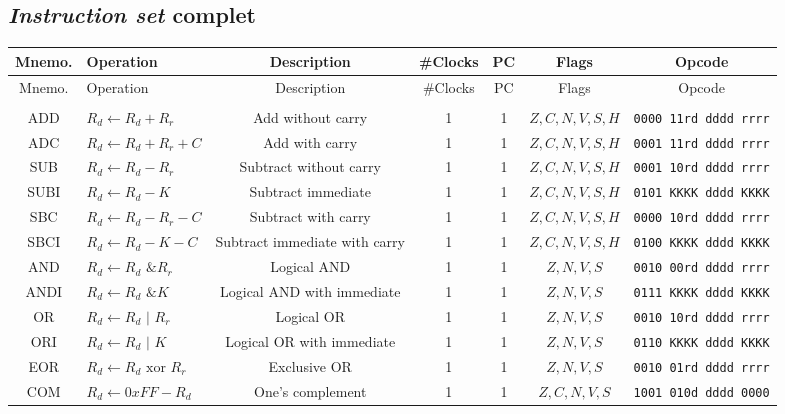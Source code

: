 \documentclass[11pt]{article}
\begin{document}
\subsection{\emph{Instruction set} complet}
\tiny
\noindent\begin{center}
    \begin{longtable}{|c|m{12em}|c|c|c|c|c|}
\hline
Mnemo. & Operation & Description & \#Clocks & PC & Flags & Opcode\\
\hline\hline
\endhead

\hline\hline
Mnemo. & Operation & Description & \#Clocks & PC & Flags & Opcode\\
\hline
\endfoot

\multicolumn{7}{|c|}{Arithmetic} \\\hline
ADD & $R_d \leftarrow R_d + R_r$ & Add without carry & 1 & 1 & $Z, C, N, V, S, H$ & \texttt{0000 11rd dddd rrrr}\\
ADC & $R_d \leftarrow R_d + R_r + C$ & Add with carry & 1 & 1 & $Z, C, N, V, S, H$ & \texttt{0001 11rd dddd rrrr}\\
SUB & $R_d \leftarrow R_d - R_r$ & Subtract without carry & 1 & 1 & $Z, C, N, V, S, H$ & \texttt{0001 10rd dddd rrrr}\\
SUBI & $R_d \leftarrow R_d - K$ & Subtract immediate & 1 & 1 & $Z, C, N, V, S, H$ & \texttt{0101 KKKK dddd KKKK}\\
SBC & $R_d \leftarrow R_d - R_r - C$ & Subtract with carry & 1 & 1 & $Z, C, N, V, S, H$ & \texttt{0000 10rd dddd rrrr}\\
SBCI & $R_d \leftarrow R_d - K - C$ & Subtract immediate with carry & 1 & 1 & $Z, C, N, V, S, H$ & \texttt{0100 KKKK dddd KKKK}\\
AND & $R_d \leftarrow R_d \text{ \& } R_r$ & Logical AND & 1 & 1 & $Z, N, V, S$ & \texttt{0010 00rd dddd rrrr}\\
ANDI & $R_d \leftarrow R_d \text{ \& } K$ & Logical AND with immediate & 1 & 1 & $Z, N, V, S$ & \texttt{0111 KKKK dddd KKKK}\\
OR & $R_d \leftarrow R_d \text{ | } R_r$ & Logical OR & 1 & 1 & $Z, N, V, S$ & \texttt{0010 10rd dddd rrrr}\\
ORI & $R_d \leftarrow R_d \text{ | } K$ & Logical OR with immediate & 1 & 1 & $Z, N, V, S$ & \texttt{0110 KKKK dddd KKKK}\\
EOR & $R_d \leftarrow R_d \text{ xor } R_r$ & Exclusive OR & 1 & 1 & $Z, N, V, S$ & \texttt{0010 01rd dddd rrrr}\\
COM & $R_d \leftarrow 0xFF - R_d$ & One's complement & 1 & 1 & $Z, C, N, V, S$ & \texttt{1001 010d dddd 0000}\\

\end{longtable}
\end{center}
\end{document}
